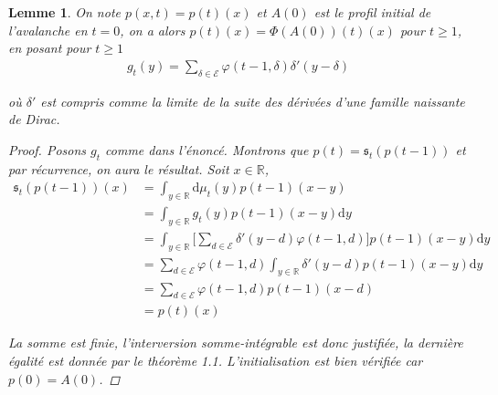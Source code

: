 \documentclass{article}
\newtheorem{lemma}[theorem]{Lemme}
\theoremstyle{definition}
\begin{document}
\begin{lemma}
	On note $p(x,t) = p(t)(x)$ et  $A(0)$ est le profil initial de l'avalanche en $t=0$, on a alors $p(t)(x) = \Phi(A(0))(t)(x)$ pour $t\geq 1$, en posant pour $t\geq 1$
	\begin{align*}
		g_t(y) = \sum_{\delta \in \mathcal{E}}\varphi(t-1,\delta)\delta'(y-\delta)
	\end{align*}

	où $\delta'$ est compris comme la limite de la suite des dérivées d'une famille naissante de Dirac. 
	\begin{proof}
		Posons $g_t$ comme dans l'énoncé. Montrons que $p(t) = \mathfrak{s}_t(p(t-1))$ et par récurrence, on aura le résultat. Soit $x\in\mathbb{R}$,  
		\begin{align*}
			\mathfrak{s}_t(p(t-1))(x) &= \int_{y\in\mathbb{R}}\mathrm{d}\mu_t(y)p(t-1)(x-y)\\
						  &= \int_{y\in\mathbb{R}} g_t(y)p(t-1)(x-y)\mathrm{d}y\\
						  &= \int_{y\in\mathbb{R}} \bigg [\sum_{d\in \mathcal{E}}\delta'(y-d)\varphi(t-1,d)\bigg]p(t-1)(x-y)\mathrm{d}y\\
						  &= \sum_{d\in\mathcal{E}}\varphi(t-1,d) \int_{y\in\mathbb{R}}\delta'(y-d) p(t-1)(x-y)\mathrm{d}y\\
						  &= \sum_{d\in\mathcal{E}}\varphi(t-1,d) p(t-1)(x-d) \\
						  &= p(t)(x)
		\end{align*}

		La somme est finie, l'interversion somme-intégrable est donc justifiée, la dernière égalité est donnée par le théorème 1.1. L'initialisation est bien vérifiée car $p(0) = A(0)$.

	\end{proof}
\end{lemma}
\end{document}
